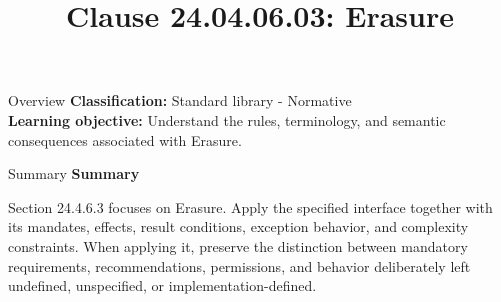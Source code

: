 \documentclass[10pt,letterpaper]{article}
\title{Clause 24.04.06.03: Erasure}
\author{}
\date{}
\begin{document}
\maketitle
\begin{CornellOverviewBox}{Overview}
\textbf{Classification:} Standard library - Normative\\[2pt]
\textbf{Learning objective:} Understand the rules, terminology, and semantic consequences associated with Erasure.
\end{CornellOverviewBox}\begin{CornellSummaryBox}{Summary}
{\sffamily\bfseries\color{Accent} Summary}\par\vspace{3pt}Section 24.4.6.3 focuses on Erasure. Apply the specified interface together with its mandates, effects, result conditions, exception behavior, and complexity constraints. When applying it, preserve the distinction between mandatory requirements, recommendations, permissions, and behavior deliberately left undefined, unspecified, or implementation-defined.
\end{CornellSummaryBox}
\end{document}
